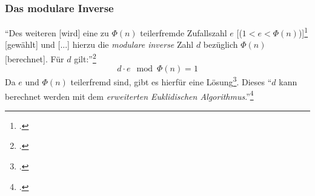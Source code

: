 \documentclass{scrarticle} %
\begin{document}
        \subsubsection{Das modulare Inverse} %
            \enquote{Des weiteren [wird] eine zu $\Phi(n)$ teilerfremde Zufallszahl $e$ [($1<e<\Phi(n)$)]\footcite[71]{watjen2008} [gewählt] und [...] hierzu die \emph{modulare inverse} Zahl $d$ bezüglich $\Phi(n)$ [berechnet]. Für $d$ gilt:}\footcite[279]{beutelspacher2015}
            \begin{equation}
                d\cdot e\mod{\Phi(n)} = 1 \label{eq:modinv}
            \end{equation}
            Da $e$ und $\Phi(n)$ teilerfremd sind, gibt es hierfür eine Lösung\footcite[Vgl.][77, 164]{ertel2003}. Dieses
            \enquote{$d$ kann berechnet werden mit dem \emph{erweiterten Euklidischen Algorithmus}.}\footcite[77]{ertel2003}
\end{document}
